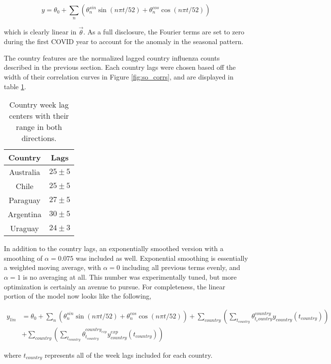 \documentclass[12pt,a4paper,english]{article}
\begin{document}
\begin{equation}
y = \theta_0 + \sum_n\left( \theta^{sin}_n\sin(n\pi t/52)+\theta^{cos}_n\cos(n\pi t/52)\right)
\end{equation}

which is clearly linear in $\vec{\theta}$. As a full disclosure, the Fourier terms are set to zero during the first COVID year to account for the anomaly in the seasonal pattern.

The country features are the normalized lagged country influenza counts described in the previous section. Each country lags were chosen based off the width of their correlation curves in Figure \ref{fig:so_corrs}, and are displayed in table \ref{tab:lags}.

\begin{table}[h!]
\begin{tabular}{cc}
Country & Lags \\
\hline
Australia & $25\pm 5$ \\
Chile & $25\pm 5$ \\
Paraguay & $27\pm 5$\\
Argentina &$ 30\pm5$ \\
Uraguay &$ 24\pm 3$
\end{tabular}
\label{tab:lags}
\caption{Country week lag centers with their range in both directions.}
\end{table}

In addition to the country lags, an exponentially smoothed version with a smoothing of $\alpha = 0.075$ was included as well. Exponential smoothing is essentially a weighted moving average, with $\alpha= 0 $ including all previous terms evenly, and $\alpha=1$ is no averaging at all. This number was experimentally tuned, but more optimization is certainly an avenue to pursue. For completeness, the linear portion of the model now looks like the following,

\begin{align*}
y_{lin} &= \theta_0 + \sum_n\left( \theta^{sin}_n\sin(n\pi t/52)+\theta^{cos}_n\cos(n\pi t/52)\right)+\sum_{country}\left(\sum_{t_{country}}\theta^{country}_{t_country}y_{country}(t_{country})        \right) \\
&+ \sum_{country}\left(  \sum_{t_{country}}\theta^{country_{exp}}_{t_{country}}y^{exp}_{country}(t_{country})  \right)     
\end{align*}

where $t_{country}$ represents all of the week lags included for each country.
\end{document}
